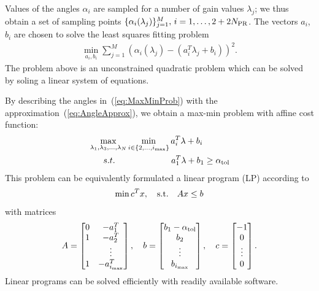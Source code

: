 \documentclass[conference,10pt]{IEEEtran}
\begin{document}
Values of the angles $\alpha_i$ are sampled for a number of gain values $\lambda_j$; we thus obtain a set of sampling points 
$\{\alpha_i(\lambda_j)\}_{j=1}^M, \, i=1,\dots, 2+2N_{\rm PR}$. The vectors $a_i$, $b_i$ are chosen to solve the least squares fitting problem
\begin{align*}
\min_{a_i,b_i}\sum_{j=1}^M\left(
\alpha_i(\lambda_j) - (a_i^T\lambda_j + b_i)
\right)^2.
\end{align*}
The problem above is an unconstrained quadratic problem which can be solved by soling a linear system of equations.





By describing the angles in~(\ref{eq:MaxMinProb})
with the approximation~(\ref{eq:AngleApprox}), we obtain a max-min problem with affine cost function:
\begin{align}
\label{eq:MaxMinProbApprox}
\begin{split}
&\max_{\lambda_1,\lambda_3,\dots, \lambda_N}\min_{i\in \{2, \dots, i_{\rm max}\}} a_i^T\lambda + b_i\\
& \hspace{6mm} {s.t.} \hspace{23mm} a_1^T\lambda + b_1\ge \alpha_{\rm tol}
\end{split}
\end{align}
 This problem can be equivalently formulated a linear program (LP) according to
\begin{align}
\label{eq:MaxMinProbLP}
\min c^Tx,\quad {\rm s.t.} \quad Ax\le b
\end{align}
with matrices
\begin{align*}
A =
\begin{bmatrix}
0 & -a^T_1\\
1 & -a^T_2\\
 & \vdots \\
1 & -a^T_{i_{\rm max}}
\end{bmatrix},\quad
b =
\begin{bmatrix}
b_1 - \alpha_\textrm{tol}\\
b_2\\
\vdots \\
b_{i_{\rm max}}
\end{bmatrix},\quad
c =
\begin{bmatrix}
-1\\
0\\
\vdots \\
0
\end{bmatrix}.
\end{align*}
Linear programs can be solved efficiently with readily available software.
\end{document}
